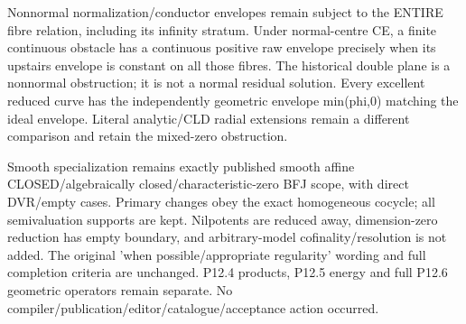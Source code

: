 \documentclass[11pt]{article}
\begin{document}
Nonnormal normalization/conductor envelopes remain subject to the ENTIRE fibre relation, including its infinity stratum. Under normal-centre CE, a finite continuous obstacle has a continuous positive raw envelope precisely when its upstairs envelope is constant on all those fibres. The historical double plane is a nonnormal obstruction; it is not a normal residual solution. Every excellent reduced curve has the independently geometric envelope min(phi,0) matching the ideal envelope. Literal analytic/CLD radial extensions remain a different comparison and retain the mixed-zero obstruction.

Smooth specialization remains exactly published smooth affine CLOSED/algebraically closed/characteristic-zero BFJ scope, with direct DVR/empty cases. Primary changes obey the exact homogeneous cocycle; all semivaluation supports are kept. Nilpotents are reduced away, dimension-zero reduction has empty boundary, and arbitrary-model cofinality/resolution is not added. The original 'when possible/appropriate regularity' wording and full completion criteria are unchanged. P12.4 products, P12.5 energy and full P12.6 geometric operators remain separate. No compiler/publication/editor/catalogue/acceptance action occurred.
\appendix
\end{document}

